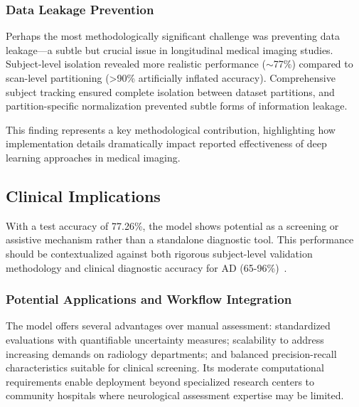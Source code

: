 \documentclass[11pt, a4paper]{article}
\begin{document}

\subsubsection{Data Leakage Prevention}

Perhaps the most methodologically significant challenge was preventing data leakage—a subtle but crucial issue in longitudinal medical imaging studies. Subject-level isolation revealed more realistic performance ($\sim$77\%) compared to scan-level partitioning (>90\% artificially inflated accuracy). Comprehensive subject tracking ensured complete isolation between dataset partitions, and partition-specific normalization prevented subtle forms of information leakage.

This finding represents a key methodological contribution, highlighting how implementation details dramatically impact reported effectiveness of deep learning approaches in medical imaging.

\subsection{Clinical Implications}

With a test accuracy of 77.26\%, the model shows potential as a screening or assistive mechanism rather than a standalone diagnostic tool. This performance should be contextualized against both rigorous subject-level validation methodology and clinical diagnostic accuracy for AD (65-96\%)~\cite{kloppel2008accuracy}.

\subsubsection{Potential Applications and Workflow Integration}

The model offers several advantages over manual assessment: standardized evaluations with quantifiable uncertainty measures; scalability to address increasing demands on radiology departments; and balanced precision-recall characteristics suitable for clinical screening. Its moderate computational requirements enable deployment beyond specialized research centers to community hospitals where neurological assessment expertise may be limited.
\end{document}
